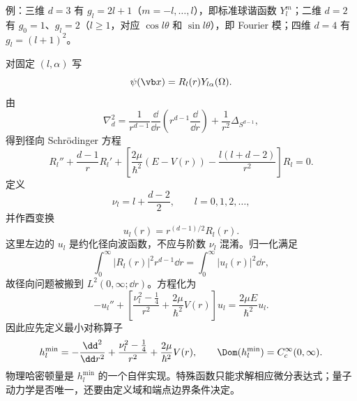 例：三维 $d=3$ 有 $g_l=2l+1$（$m=-l,\ldots,l$），即标准球谐函数 $Y_l^m$；二维 $d=2$ 有 $g_0=1$、$g_l=2$（$l\ge1$，对应 $\cos l\theta$ 和 $\sin l\theta$），即 Fourier 模；四维 $d=4$ 有 $g_l=(l+1)^2$。

对固定 $(l,\alpha)$ 写
\[
\psi(\vb x)=R_l(r)Y_{l\alpha}(\Omega).
\]
由
\[
\nabla_d^2=\frac{1}{r^{d-1}}\frac{\dd}{\dd r}
\left(r^{d-1}\frac{\dd}{\dd r}\right)
+\frac1{r^2}\Delta_{S^{d-1}},
\]
得到径向 Schr\"odinger 方程
\begin{equation}
R_l''+\frac{d-1}{r}R_l'
+\left[
\frac{2\mu}{\hbar^2}(E-V(r))
-\frac{l(l+d-2)}{r^2}
\right]R_l=0.
\label{eq:phys-hdqm-radial-r}
\end{equation}
定义
\begin{equation}
\nu_l=l+\frac{d-2}{2},\qquad
l=0,1,2,\ldots,
\label{eq:phys-hdqm-nu}
\end{equation}
并作酉变换
\[
u_l(r)=r^{(d-1)/2}R_l(r).
\]
这里左边的 $u_l$ 是约化径向波函数，不应与阶数 $\nu_l$ 混淆。归一化满足
\[
\int_0^\infty |R_l(r)|^2r^{d-1}\dd r
=\int_0^\infty |u_l(r)|^2\dd r,
\]
故径向问题被搬到 $L^2(0,\infty;\dd r)$。方程化为
\begin{equation}
-u_l''+
\left[
\frac{\nu_l^2-\frac14}{r^2}
+\frac{2\mu}{\hbar^2}V(r)
\right]u_l
=\frac{2\mu E}{\hbar^2}u_l.
\label{eq:phys-hdqm-radial-u}
\end{equation}
因此应先定义最小对称算子
\begin{equation}
 h_l^{\min}
=-\frac{\dd^2}{\dd r^2}
+\frac{\nu_l^2-\frac14}{r^2}
+\frac{2\mu}{\hbar^2}V(r),
\qquad
\Dom(h_l^{\min})=C_c^\infty(0,\infty).
\label{eq:phys-hdqm-radial-minimal-operator}
\end{equation}
物理哈密顿量是 $h_l^{\min}$ 的一个自伴实现。特殊函数只能求解相应微分表达式；量子动力学是否唯一，还要由定义域和端点边界条件决定。

